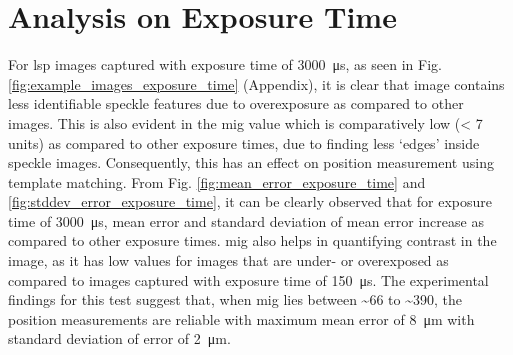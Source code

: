 
\section{Analysis on Exposure Time}\label{section:analysis_exposure_time}
    For \gls{lsp} images captured with exposure time of \SI{3000}{\micro\second}, as seen in Fig. \ref{fig:example_images_exposure_time} (Appendix), it is clear that image contains less identifiable speckle features due to overexposure as compared to other images. This is also evident in the \gls{mig} value which is comparatively low (< 7 units) as compared to other exposure times, due to finding less `edges' inside speckle images. Consequently, this has an effect on position measurement using template matching. From Fig. \ref{fig:mean_error_exposure_time} and \ref{fig:stddev_error_exposure_time}, it can be clearly observed that for exposure time of \SI{3000}{\micro\second}, mean error and standard deviation of mean error increase as compared to other exposure times. \gls{mig} also helps in quantifying contrast in the image, as it has low values for images that are under- or overexposed as compared to images captured with exposure time of \SI{150}{\micro\second}. The experimental findings for this test suggest that, when \gls{mig} lies between \sim66 to \sim390, the position measurements are reliable with maximum mean error of \SI{8}{\micro\meter} with standard deviation of error of \SI{2}{\micro\meter}.

